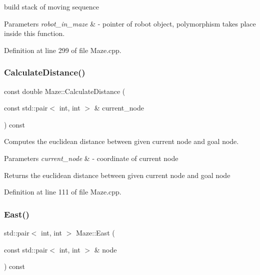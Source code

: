 build stack of moving sequence 


\begin{DoxyParams}{Parameters}
{\em robot\+\_\+in\+\_\+maze} & -\/ pointer of robot object, polymorphism takes place inside this function. \\
\hline
\end{DoxyParams}


Definition at line 299 of file Maze.\+cpp.

\mbox{\label{class_maze_a63c6a579efa7406b44288b5dbc04cb02}} 
\subsubsection{\texorpdfstring{CalculateDistance()}{CalculateDistance()}}
{\footnotesize\ttfamily const double Maze\+::\+Calculate\+Distance (\begin{DoxyParamCaption}\item[{const std\+::pair$<$ int, int $>$ \&}]{current\+\_\+node }\end{DoxyParamCaption}) const}



Computes the euclidean distance between given current node and goal node. 


\begin{DoxyParams}{Parameters}
{\em current\+\_\+node} & -\/ coordinate of current node \\
\hline
\end{DoxyParams}
\begin{DoxyReturn}{Returns}
the euclidean distance between given current node and goal node 
\end{DoxyReturn}


Definition at line 111 of file Maze.\+cpp.

\mbox{\label{class_maze_a6c85c90908bbff0e89ffb23be8e40873}} 
\subsubsection{\texorpdfstring{East()}{East()}}
{\footnotesize\ttfamily std\+::pair$<$ int, int $>$ Maze\+::\+East (\begin{DoxyParamCaption}\item[{const std\+::pair$<$ int, int $>$ \&}]{node }\end{DoxyParamCaption}) const}



